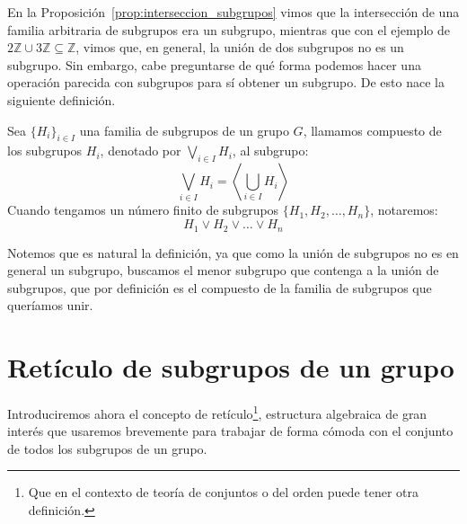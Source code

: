 En la Proposición~\ref{prop:interseccion_subgrupos} vimos que la intersección de una familia arbitraria de subgrupos era un subgrupo, mientras que con el ejemplo de $2\mathbb{Z}\cup 3\mathbb{Z}\subseteq \mathbb{Z}$, vimos que, en general, la unión de dos subgrupos no es un subgrupo. Sin embargo, cabe preguntarse de qué forma podemos hacer una operación parecida con subgrupos para sí obtener un subgrupo. De esto nace la siguiente definición.

\begin{definicion}[Compuesto]
    Sea $\{H_i\}_{i \in I}$ una familia de subgrupos de un grupo $G$, llamamos compuesto de los subgrupos $H_i$, denotado por $\bigvee\limits_{i \in I} H_i$, al subgrupo:
    \begin{equation*}
        \bigvee_{i \in I} H_i = \left\langle \bigcup_{i \in I} H_i \right\rangle 
    \end{equation*}
    Cuando tengamos un número finito de subgrupos $\{H_1, H_2, \ldots, H_n\}$, notaremos:
    \begin{equation*}
        H_1\lor H_2\lor \ldots \lor H_n
    \end{equation*}
\end{definicion}

Notemos que es natural la definición, ya que como la unión de subgrupos no es en general un subgrupo, buscamos el menor subgrupo que contenga a la unión de subgrupos, que por definición es el compuesto de la familia de subgrupos que queríamos unir.

\section{Retículo de subgrupos de un grupo}
Introduciremos ahora el concepto de retículo\footnote{Que en el contexto de teoría de conjuntos o del orden puede tener otra definición.}, estructura algebraica de gran interés que usaremos brevemente para trabajar de forma cómoda con el conjunto de todos los subgrupos de un grupo.

